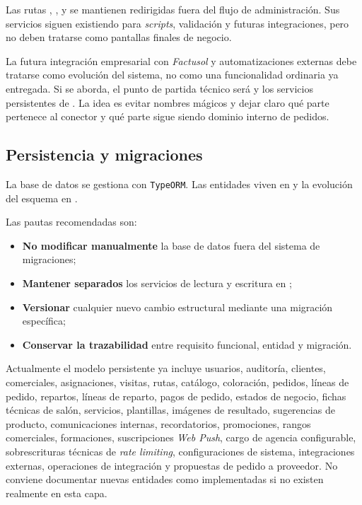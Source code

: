Las rutas , ,  y  se mantienen redirigidas fuera del flujo de administración. Sus servicios siguen existiendo para \textit{scripts}, validación y futuras integraciones, pero no deben tratarse como pantallas finales de negocio.

La futura integración empresarial con \textit{Factusol} y automatizaciones externas debe tratarse como evolución del sistema, no como una funcionalidad ordinaria ya entregada. Si se aborda, el punto de partida técnico será  y los servicios persistentes de . La idea es evitar nombres mágicos y dejar claro qué parte pertenece al conector y qué parte sigue siendo dominio interno de pedidos.

\subsection{Persistencia y migraciones}

La base de datos se gestiona con \texttt{TypeORM}. Las entidades viven en  y la evolución del esquema en .

Las pautas recomendadas son:

\begin{itemize}
    \item \textbf{No modificar manualmente} la base de datos fuera del sistema de migraciones;
    \item \textbf{Mantener separados} los servicios de lectura y escritura en ;
    \item \textbf{Versionar} cualquier nuevo cambio estructural mediante una migración específica;
    \item \textbf{Conservar la trazabilidad} entre requisito funcional, entidad y migración.
\end{itemize}

Actualmente el modelo persistente ya incluye usuarios, auditoría, clientes, comerciales, asignaciones, visitas, rutas, catálogo, coloración, pedidos, líneas de pedido, repartos, líneas de reparto, pagos de pedido, estados de negocio, fichas técnicas de salón, servicios, plantillas, imágenes de resultado, sugerencias de producto, comunicaciones internas, recordatorios, promociones, rangos comerciales, formaciones, suscripciones \textit{Web Push}, cargo de agencia configurable, sobrescrituras técnicas de \textit{rate limiting}, configuraciones de sistema, integraciones externas, operaciones de integración y propuestas de pedido a proveedor. No conviene documentar nuevas entidades como implementadas si no existen realmente en esta capa.

